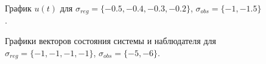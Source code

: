 \begin{figure}[!h]
	\caption{График $u(t)$ для $\sigma_{reg} = \{ -0.5, -0.4, -0.3, -0.2\}$, $\sigma_{obs}= \{-1, -1.5 \}$.}
	\label{3_u_k3l1}
\end{figure}


\begin{figure}[!h]
	\caption{Графики векторов состояния системы и наблюдателя для $\sigma_{reg} = \{ -1, -1, -1, -1\}$, $\sigma_{obs}= \{-5, -6 \}$.}
	\label{3_x_k1l2}
\end{figure}

